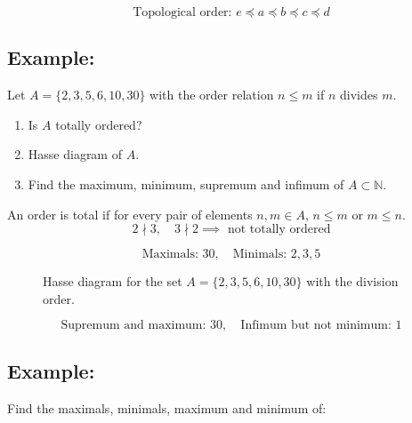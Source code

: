 \documentclass[11pt]{article}
\begin{document}
\[
\text{Topological order: } e \preceq a \preceq b \preceq c \preceq d
\]

\subsection*{Example:}
Let $A = \{2,3,5,6,10,30\}$ with the order relation $n \leq m$ if $n$ divides $m$. 
\begin{enumerate}
    \item Is $A$ totally ordered?
    \item Hasse diagram of $A$.
    \item Find the maximum, minimum, supremum and infimum of $A \subset \mathbb{N}$.
\end{enumerate}

An order is total if for every pair of elements $n, m \in A$, $n \leq m$ or $m \leq n$.
\[
2 \nmid 3, \quad 3 \nmid 2 \implies \text{ not totally ordered}
\]

\[
\text{Maximals: } 30, \quad \text{Minimals: } 2, 3, 5
\]

\begin{figure}[H]
    \centering
    \caption{Hasse diagram for the set $A = \{2,3,5,6,10,30\}$ with the division order.}
    \label{fig:hasse_division}
\end{figure}

\[
\text{Supremum and maximum: } 30, \quad \text{Infimum but not minimum: } 1
\]

\subsection*{Example:}
Find the maximals, minimals, maximum and minimum of:
\end{document}
